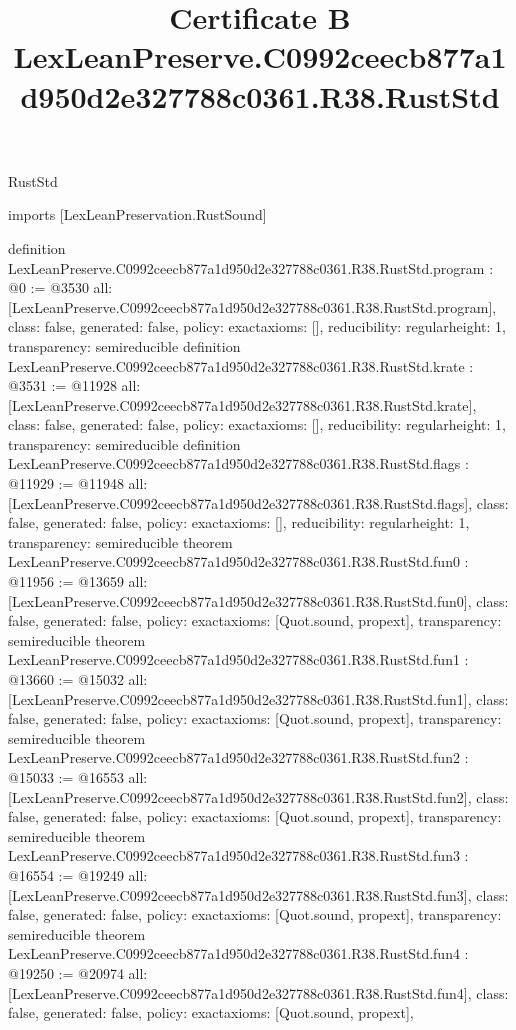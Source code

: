 \begin{lexlean}{RustStd}
\title{Certificate B LexLeanPreserve.C0992ceecb877a1d950d2e327788c0361.R38.RustStd}
\begin{coremodule}
imports [LexLeanPreservation.RustSound]

definition LexLeanPreserve.C0992ceecb877a1d950d2e327788c0361.R38.RustStd.program : @0 := @3530 {
  all: [LexLeanPreserve.C0992ceecb877a1d950d2e327788c0361.R38.RustStd.program],
  class: false,
  generated: false,
  policy: exact{axioms: []},
  reducibility: regular{height: 1},
  transparency: semireducible
}
definition LexLeanPreserve.C0992ceecb877a1d950d2e327788c0361.R38.RustStd.krate : @3531 := @11928 {
  all: [LexLeanPreserve.C0992ceecb877a1d950d2e327788c0361.R38.RustStd.krate],
  class: false,
  generated: false,
  policy: exact{axioms: []},
  reducibility: regular{height: 1},
  transparency: semireducible
}
definition LexLeanPreserve.C0992ceecb877a1d950d2e327788c0361.R38.RustStd.flags : @11929 := @11948 {
  all: [LexLeanPreserve.C0992ceecb877a1d950d2e327788c0361.R38.RustStd.flags],
  class: false,
  generated: false,
  policy: exact{axioms: []},
  reducibility: regular{height: 1},
  transparency: semireducible
}
theorem LexLeanPreserve.C0992ceecb877a1d950d2e327788c0361.R38.RustStd.fun0 : @11956 := @13659 {
  all: [LexLeanPreserve.C0992ceecb877a1d950d2e327788c0361.R38.RustStd.fun0],
  class: false,
  generated: false,
  policy: exact{axioms: [Quot.sound, propext]},
  transparency: semireducible
}
theorem LexLeanPreserve.C0992ceecb877a1d950d2e327788c0361.R38.RustStd.fun1 : @13660 := @15032 {
  all: [LexLeanPreserve.C0992ceecb877a1d950d2e327788c0361.R38.RustStd.fun1],
  class: false,
  generated: false,
  policy: exact{axioms: [Quot.sound, propext]},
  transparency: semireducible
}
theorem LexLeanPreserve.C0992ceecb877a1d950d2e327788c0361.R38.RustStd.fun2 : @15033 := @16553 {
  all: [LexLeanPreserve.C0992ceecb877a1d950d2e327788c0361.R38.RustStd.fun2],
  class: false,
  generated: false,
  policy: exact{axioms: [Quot.sound, propext]},
  transparency: semireducible
}
theorem LexLeanPreserve.C0992ceecb877a1d950d2e327788c0361.R38.RustStd.fun3 : @16554 := @19249 {
  all: [LexLeanPreserve.C0992ceecb877a1d950d2e327788c0361.R38.RustStd.fun3],
  class: false,
  generated: false,
  policy: exact{axioms: [Quot.sound, propext]},
  transparency: semireducible
}
theorem LexLeanPreserve.C0992ceecb877a1d950d2e327788c0361.R38.RustStd.fun4 : @19250 := @20974 {
  all: [LexLeanPreserve.C0992ceecb877a1d950d2e327788c0361.R38.RustStd.fun4],
  class: false,
  generated: false,
  policy: exact{axioms: [Quot.sound, propext]},
}
\end{coremodule}
\end{lexlean}
